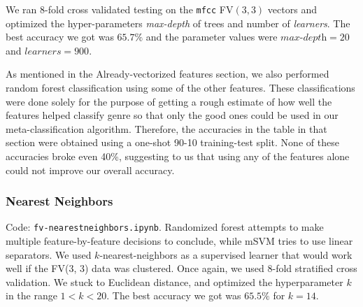 \documentclass[9pt]{article}
\begin{document}
We ran 8-fold cross validated testing on the \texttt{mfcc} FV$(3, 3)$ vectors and optimized
the hyper-parameters {\em max-depth} of trees and number of {\em learners}.
The best accuracy we got was $65.7\%$ and the parameter values were $\textit{max-depth} = 20$  and $\textit{learners} = 900$.

As mentioned in the Already-vectorized features section,
we also performed random forest classification using some of the other features.
These classifications were done solely for the purpose of getting a rough estimate
of how well the features helped classify genre so that only the good ones could
be used in our meta-classification algorithm.
Therefore, the accuracies in the table in that section were obtained using
a one-shot 90-10 training-test split.
None of these accuracies broke even 40\%, suggesting to us that using any of the features
alone could not improve our overall accuracy.

\subsubsection{Nearest Neighbors} \label{knn}
Code: \texttt{fv-nearestneighbors.ipynb}.
Randomized forest attempts to make multiple feature-by-feature decisions to conclude,
while mSVM tries to use linear separators.
We used $k$-nearest-neighbors as a supervised learner that would work well if the FV(3, 3) data was clustered.
Once again, we used 8-fold stratified cross validation.
We stuck to Euclidean distance, and optimized the hyperparameter $k$ in the range $1 < k < 20$.
The best accuracy we got was $65.5\%$ for $k = 14$.
\end{document}
